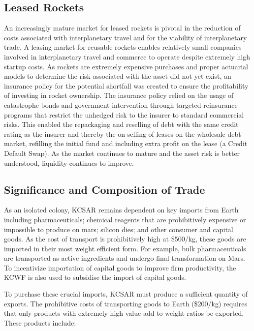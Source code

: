 \documentclass[fleqn,10pt]{Stylesheet} %
\begin{document}
\subsection{Leased Rockets}
An increasingly mature market for leased rockets is pivotal in the reduction of costs associated with interplanetary travel and for the viability of interplanetary trade. A leasing market for reusable rockets enables relatively small companies involved in interplanetary travel and commerce to operate despite extremely high startup costs. As rockets are extremely expensive purchases and proper actuarial models to determine the risk associated with the asset did not yet exist, an insurance policy for the potential shortfall was created to ensure the profitability of investing in rocket ownership. The insurance policy relied on the usage of catastrophe bonds and government intervention through targeted reinsurance programs that restrict the unhedged risk to the insurer to standard commercial risks. This enabled the repackaging and reselling of debt with the same credit rating as the insurer and thereby the on-selling of leases on the wholesale debt market, refilling the initial fund and including extra profit on the lease (a Credit Default Swap). As the market continues to mature and the asset risk is better understood, liquidity continues to improve.

\subsection{Significance and Composition of Trade}
As an isolated colony, KCSAR remains dependent on key imports from Earth including pharmaceuticals; chemical reagents that are prohibitively expensive or impossible to produce on mars; silicon dies; and other consumer and capital goods. As the cost of transport is prohibitively high at \$500/kg, these goods are imported in their most weight efficient form. For example, bulk pharmaceuticals are transported as active ingredients and undergo final transformation on Mars. To incentivize importation of capital goods to improve firm productivity, the KCWF is also used to subsidise the import of capital goods. 

To purchase these crucial imports, KCSAR must produce a sufficient quantity of exports. The prohibitive costs of transporting goods to Earth (\$200/kg) requires that only products with extremely high value-add to weight ratios be exported. These products include:
\end{document}
